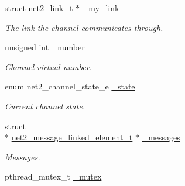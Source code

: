 \begin{DoxyCompactItemize}
\item 
\hypertarget{structnet2__channel__input__t_a17a505dbbe397c65e441c5fc1beb127f}{struct \hyperlink{structnet2__link__t}{net2\-\_\-link\-\_\-t} $\ast$ \hyperlink{structnet2__channel__input__t_a17a505dbbe397c65e441c5fc1beb127f}{\-\_\-my\-\_\-link}}\label{structnet2__channel__input__t_a17a505dbbe397c65e441c5fc1beb127f}

\begin{DoxyCompactList}\small\item\em The link the channel communicates through. \end{DoxyCompactList}\item 
\hypertarget{structnet2__channel__input__t_aad432fed1cbfe759ef2d473ab8f47109}{unsigned int \hyperlink{structnet2__channel__input__t_aad432fed1cbfe759ef2d473ab8f47109}{\-\_\-number}}\label{structnet2__channel__input__t_aad432fed1cbfe759ef2d473ab8f47109}

\begin{DoxyCompactList}\small\item\em Channel virtual number. \end{DoxyCompactList}\item 
\hypertarget{structnet2__channel__input__t_a3363f7063e071be71e1320617a870b84}{enum net2\-\_\-channel\-\_\-state\-\_\-e \hyperlink{structnet2__channel__input__t_a3363f7063e071be71e1320617a870b84}{\-\_\-state}}\label{structnet2__channel__input__t_a3363f7063e071be71e1320617a870b84}

\begin{DoxyCompactList}\small\item\em Current channel state. \end{DoxyCompactList}\item 
\hypertarget{structnet2__channel__input__t_a62adebf1311e1002e0f5a67fa00ea1a0}{struct \\*
\hyperlink{structnet2__message__linked__element__t}{net2\-\_\-message\-\_\-linked\-\_\-element\-\_\-t} $\ast$ \hyperlink{structnet2__channel__input__t_a62adebf1311e1002e0f5a67fa00ea1a0}{\-\_\-messages}}\label{structnet2__channel__input__t_a62adebf1311e1002e0f5a67fa00ea1a0}

\begin{DoxyCompactList}\small\item\em Messages. \end{DoxyCompactList}\item 
\hypertarget{structnet2__channel__input__t_a9d656c00ee2f6d89286272487bac4ec3}{pthread\-\_\-mutex\-\_\-t \hyperlink{structnet2__channel__input__t_a9d656c00ee2f6d89286272487bac4ec3}{\-\_\-mutex}}\label{structnet2__channel__input__t_a9d656c00ee2f6d89286272487bac4ec3}


\end{DoxyCompactItemize}
